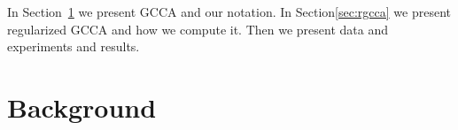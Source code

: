 \documentclass[11pt]{article}
\begin{document}
In Section~\ref{sec:gcca} we present GCCA and our notation. In
Section\ref{sec:rgcca} we present regularized GCCA 
 and how we compute it. Then we present data and experiments and results.

\section{Background}
\label{sec:gcca}



\end{document}

